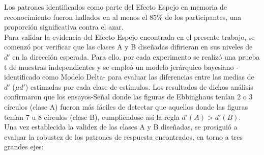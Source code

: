 Los patrones identificados como parte del Efecto Espejo en memoria de reconocimiento fueron hallados en al menos el $85\%$ de los participantes, una proporción significativa contra el azar.\\

Para validar la evidencia del Efecto Espejo encontrada en el presente trabajo, se comenzó por verificar que las clases A y B diseñadas difirieran en sus niveles de $d'$ en la dirección esperada. Para ello, por cada experimento se realizó una prueba t de muestras independientes y se empleó un modelo jerárquico bayesiano -identificado como Modelo Delta- para evaluar las diferencias entre las medias de $d'$  ($\mu d'$) estimadas por cada clase de estímulos. Los resultados de dichos análisis confirmaron que los ensayos-Señal donde las figuras de Ebbinghaus tenían 2 o 3 círculos (clase A) fueron más fáciles de detectar que aquellos donde las figuras tenían 7 u 8 círculos (clase B), cumpliendose así la regla $d'(A) > d'(B)$.\\


Una vez establecida la validez de las clases A y B diseñadas, se prosiguió a evaluar la robustez de los patrones de respuesta encontrados, en torno a tres grandes ejes:\\

